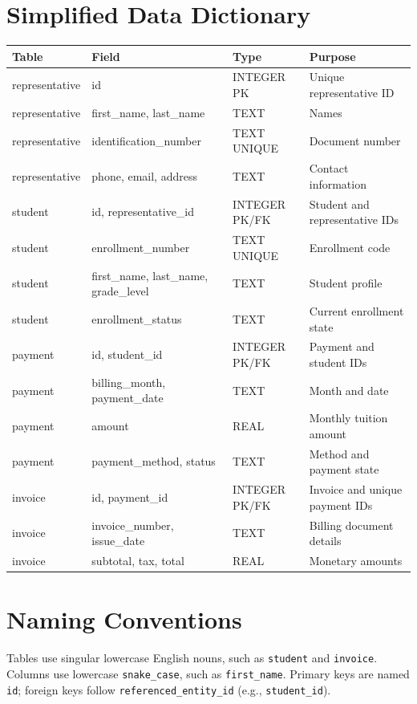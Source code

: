 \documentclass[11pt,letterpaper]{article}
\begin{document}
\appendix
\section{Simplified Data Dictionary}
\begin{longtable}{p{2.5cm}p{3.9cm}p{2cm}p{4.2cm}}\toprule
Table & Field & Type & Purpose\\\midrule\endhead
representative & id & INTEGER PK & Unique representative ID\\
representative & first\_name, last\_name & TEXT & Names\\
representative & identification\_number & TEXT UNIQUE & Document number\\
representative & phone, email, address & TEXT & Contact information\\
student & id, representative\_id & INTEGER PK/FK & Student and representative IDs\\
student & enrollment\_number & TEXT UNIQUE & Enrollment code\\
student & first\_name, last\_name, grade\_level & TEXT & Student profile\\
student & enrollment\_status & TEXT & Current enrollment state\\
payment & id, student\_id & INTEGER PK/FK & Payment and student IDs\\
payment & billing\_month, payment\_date & TEXT & Month and date\\
payment & amount & REAL & Monthly tuition amount\\
payment & payment\_method, status & TEXT & Method and payment state\\
invoice & id, payment\_id & INTEGER PK/FK & Invoice and unique payment IDs\\
invoice & invoice\_number, issue\_date & TEXT & Billing document details\\
invoice & subtotal, tax, total & REAL & Monetary amounts\\\bottomrule
\end{longtable}
\section{Naming Conventions}
Tables use singular lowercase English nouns, such as \texttt{student} and \texttt{invoice}. Columns use lowercase \texttt{snake\_case}, such as \texttt{first\_name}. Primary keys are named \texttt{id}; foreign keys follow \texttt{referenced\_entity\_id} (e.g., \texttt{student\_id}).
\end{document}
